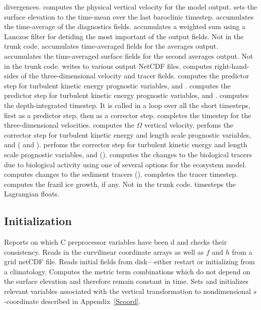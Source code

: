 \begin{klist}
  divergences.
   computes the physical vertical velocity for the
  model output.
   sets the surface elevation to the time-mean over the
  last baroclinic timestep.
   accumulates the time-average of the diagnostics
  fields.
   accumulates a weighted sum using a Lanczos filter
  for detiding the most important of the output fields. Not in the trunk
  code.
   accumulates time-averaged fields for the averages
  output.
   accumulates the time-averaged surface fields for the
  second averages output. Not in the trunk code.
   writes to various output NetCDF files.
   computes right-hand-sides of the three-dimensional
  velocity and tracer fields.
   computes the predictor step for turbulent
  kinetic energy prognostic variables,  and .
   computes the predictor step for turbulent
  kinetic energy prognostic variables,  and .
   computes the depth-integrated timestep. It is called in
  a loop over all the short timesteps, first as a predictor step, then
  as a corrector step.
   completes the timestep for the three-dimensional
  velocities.
   computes the $\Omega$ vertical velocity.
   perfoms the corrector step for turbulent kinetic
  energy and length scale prognostic variables,  and 
  (\cite{Mellor82} and \cite{Galperin88}).
   perfoms the corrector step for turbulent kinetic
  energy and length scale prognostic variables,  and 
  (\cite{Umlauf2001}).
   computes the changes to the biological tracers due to
  biological activity using one of several options for the ecosystem
  model.
   computes changes to the sediment tracers
  (\cite{Warner_2008}).
   completes the tracer timestep.
   computes the frazil ice growth, if any. Not in the
  trunk code.
   timesteps the Lagrangian floats.
\end{klist}

\subsection{Initialization}
\label{Ini}
   \begin{klist}
     Reports on which C preprocessor variables
   have been d and checks their consistency.
      Reads in the curvilinear coordinate arrays as
   well as $f$ and $h$ from a grid netCDF file.
      Reads initial fields from disk---either
   restart or initializing from a climatology.
        Computes the metric term combinations which do
   not depend on the surface elevation and therefore remain constant in
   time.
       Sets and initializes relevant variables
   associated with the vertical transformation to nondimensional
   $s$-coordinate described in Appendix~\ref{Scoord}.
   \end{klist}

